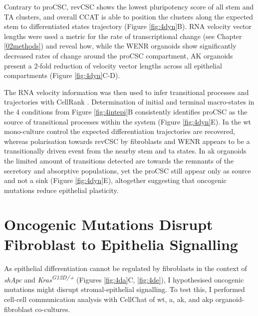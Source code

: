 Contrary to proCSC, revCSC shows the lowest pluripotency score of all stem and TA clusters, and overall CCAT is able to position the clusters along the expected stem to differentiated states trajectory (Figure \ref{fig:4dyn}B). RNA velocity \cite{bergen_generalizing_2020} vector lengths were used a metric for the rate of transcriptional change (see Chapter \ref{02methods}) and reveal how, while the WENR organoids show significantly decreased rates of change around the proCSC compartment, AK organoids present a 2-fold reduction of velocity vector lengths across all epithelial compartments (Figure \ref{fig:4dyn}C-D).

The RNA velocity information was then used to infer transitional processes and trajectories with CellRank \cite{lange_cellrank_2022}. Determination of initial and terminal macro-states in the 4 conditions from Figure \ref{fig:4intepi}B consistently identifies proCSC as the source of transitional processes within the system (Figure \ref{fig:4dyn}E). In the \acrshort{wt} mono-culture control the expected differentiation trajectories are recovered, whereas polarisation towards revCSC by fibroblasts and WENR appears to be a transitionally driven event from the nearby stem and \acrshort{ta} states. In \acrshort{ak} organoids the limited amount of transitions detected are towards the remnants of the secretory and absorptive populations, yet the proCSC still appear only as source and not a sink (Figure \ref{fig:4dyn}E), altogether suggesting that oncogenic mutations reduce epithelial plasticity. 

\section{Oncogenic Mutations Disrupt Fibroblast to Epithelia Signalling}

As epithelial differentiation cannot be regulated by fibroblasts in the context of \textit{shApc} and \textit{Kras\textsuperscript{G12D/+}} (Figures \ref{fig:4da}C, \ref{fig:4de}), I hypothesised oncogenic mutations might disrupt stromal-epithelial signalling. To test this, I performed cell-cell communication analysis with CellChat \cite{jin_inference_2021} of \acrshort{wt}, \acrshort{a}, \acrshort{ak}, and \acrshort{akp} organoid-fibroblast co-cultures. 

